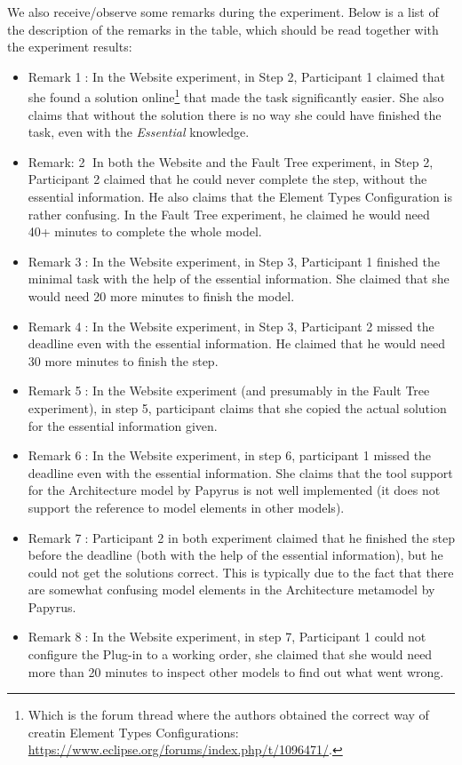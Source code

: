 We also receive/observe some remarks during the experiment.
Below is a list of the description of the remarks in the table, which should be read together with the experiment results:
\begin{itemize}
	\item Remark \textcircled{1}: In the Website experiment, in Step 2, Participant 1 claimed that she found a solution online\footnote{Which is the forum thread where the authors obtained the correct way of creatin Element Types Configurations: \url{https://www.eclipse.org/forums/index.php/t/1096471/}.} that made the task significantly easier. 
	She also claims that without the solution there is no way she could have finished the task, even with the \textit{Essential} knowledge.
	\item Remark: \textcircled{2} In both the Website and the Fault Tree experiment, in Step 2, Participant 2 claimed that he could never complete the step, without the essential information. 
	He also claims that the Element Types Configuration is rather confusing.
	In the Fault Tree experiment, he claimed he would need 40+ minutes to complete the whole model.
	\item Remark \textcircled{3}: In the Website experiment, in Step 3, Participant 1 finished the minimal task with the help of the essential information. She	claimed that she would need 20 more minutes to finish the model.
	\item Remark \textcircled{4}: In the Website experiment, in Step 3, Participant 2 missed the deadline even with the essential information.
	He claimed that he would need 30 more minutes to finish the step.
	\item Remark \textcircled{5}: In the Website experiment (and presumably in the Fault Tree experiment), in step 5, participant claims that she copied the actual solution for the essential information given.
	\item Remark \textcircled{6}: In the Website experiment, in step 6, participant 1 missed the deadline even with the essential information. 
	She claims that the tool support for the Architecture model by Papyrus is not well implemented (it does not support the reference to model elements in other models).
	\item Remark \textcircled{7}: Participant 2 in both experiment claimed that he finished the step before the deadline (both with the help of the essential information), but he could not get the solutions correct. 
	This is typically due to the fact that there are somewhat confusing model elements in the Architecture metamodel by Papyrus.
	\item Remark \textcircled{8}: In the Website experiment, in step 7, Participant 1 could not configure the Plug-in to a working order, she claimed that she would need more than 20 minutes to inspect other models to find out what went wrong.
\end{itemize}

